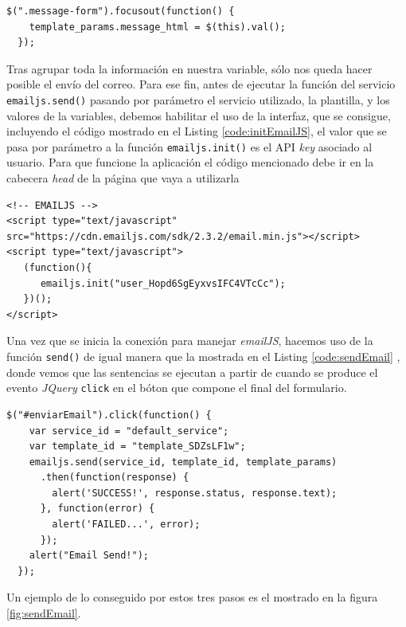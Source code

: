 \begin{lstlisting}[caption=Código para obtener la información de \texttt{message-form},label={code:jquery1}]
  $(".message-form").focusout(function() {
    template_params.message_html = $(this).val();
  });
\end{lstlisting}

Tras agrupar toda la información en nuestra variable, sólo nos queda hacer posible el envío del correo. Para ese fin, antes de ejecutar la función del servicio \texttt{emailjs.send()} pasando por parámetro el servicio utilizado, la plantilla, y los valores de la variables, debemos habilitar el uso de la interfaz, que se consigue, incluyendo el código mostrado en el Listing \ref{code:initEmailJS}, el valor que se pasa por parámetro a la función \texttt{emailjs.init()} es el API \textit{key} asociado al usuario. Para que funcione la aplicación el código mencionado debe ir en la cabecera \textit{head} de la página que vaya a utilizarla

\begin{lstlisting}[caption=Código que permite conectarse con la interfaz de \textit{emailJs},label={code:initEmailJS}]
  <!-- EMAILJS -->
<script type="text/javascript" src="https://cdn.emailjs.com/sdk/2.3.2/email.min.js"></script>
<script type="text/javascript">
   (function(){
      emailjs.init("user_Hopd6SgEyxvsIFC4VTcCc");
   })();
</script>
\end{lstlisting}


Una vez que se inicia la conexión para manejar \textit{emailJS}, hacemos uso de la función \texttt{send()} de igual manera que la mostrada en el Listing \ref{code:sendEmail} , donde vemos que las sentencias se ejecutan a partir de cuando se produce el evento \textit{JQuery} \texttt{click} en el bóton que compone el final del formulario.

\begin{lstlisting}[caption=Código que produce el envío de correo,label={code:sendEmail}]
  $("#enviarEmail").click(function() {
    var service_id = "default_service";
    var template_id = "template_SDZsLF1w";
    emailjs.send(service_id, template_id, template_params)
      .then(function(response) {
        alert('SUCCESS!', response.status, response.text);
      }, function(error) {
        alert('FAILED...', error);
      });
    alert("Email Send!");
  });
\end{lstlisting}

Un ejemplo de lo conseguido por estos tres pasos es el mostrado en la figura \ref{fig:sendEmail}.

